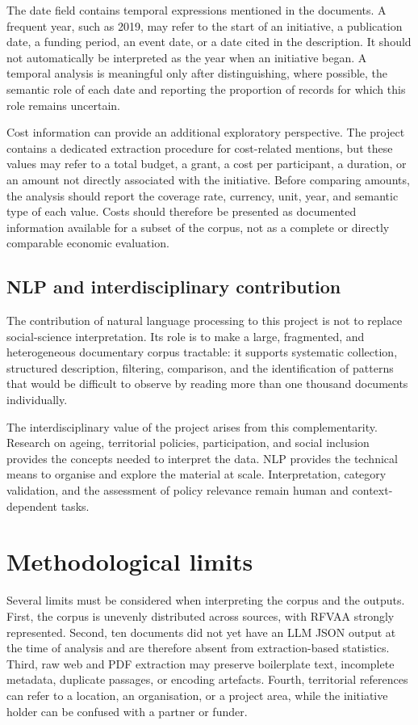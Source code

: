 \documentclass[
11pt,
english,
singlespacing,
headsepline,
]{MastersDoctoralThesis}
\begin{document}
The date field contains temporal expressions mentioned in the documents. A
frequent year, such as 2019, may refer to the start of an initiative, a
publication date, a funding period, an event date, or a date cited in the
description. It should not automatically be interpreted as the year when an
initiative began. A temporal analysis is meaningful only after distinguishing,
where possible, the semantic role of each date and reporting the proportion of
records for which this role remains uncertain.

Cost information can provide an additional exploratory perspective. The project
contains a dedicated extraction procedure for cost-related mentions, but these
values may refer to a total budget, a grant, a cost per participant, a duration,
or an amount not directly associated with the initiative. Before comparing
amounts, the analysis should report the coverage rate, currency, unit, year,
and semantic type of each value. Costs should therefore be presented as
documented information available for a subset of the corpus, not as a complete
or directly comparable economic evaluation.

\subsection{NLP and interdisciplinary contribution}

The contribution of natural language processing to this project is not to
replace social-science interpretation. Its role is to make a large, fragmented,
and heterogeneous documentary corpus tractable: it supports systematic
collection, structured description, filtering, comparison, and the
identification of patterns that would be difficult to observe by reading more
than one thousand documents individually.

The interdisciplinary value of the project arises from this complementarity.
Research on ageing, territorial policies, participation, and social inclusion
provides the concepts needed to interpret the data. NLP provides the technical
means to organise and explore the material at scale. Interpretation, category
validation, and the assessment of policy relevance remain human and
context-dependent tasks.

\section{Methodological limits}

Several limits must be considered when interpreting the corpus and the outputs.
First, the corpus is unevenly distributed across sources, with RFVAA strongly
represented. Second, ten documents did not yet have an LLM JSON output at the
time of analysis and are therefore absent from extraction-based statistics.
Third, raw web and PDF extraction may preserve boilerplate text, incomplete
metadata, duplicate passages, or encoding artefacts. Fourth,
territorial references can refer to a location, an organisation, or a project
area, while the initiative holder can be confused with a partner or funder.
\end{document}
